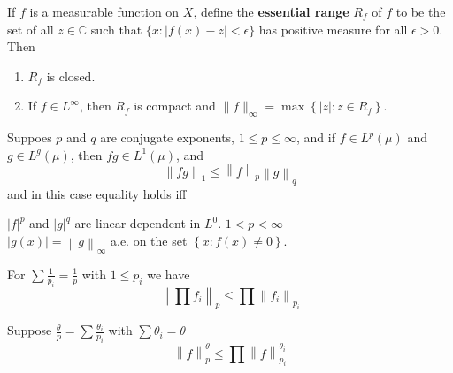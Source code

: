 \documentclass[12pt, a4paper, oneside]{book}
\begin{document}
\begin{proposition}
    If $f$ is a measurable function on $X$, define the \textbf{essential range} $R_f$ of $f$ to be the set of all $z \in \mathbb{C}$ such that $\{x:|f(x)-z|<\epsilon\}$ has positive measure for all $\epsilon>0$. Then
    \begin{enumerate}
        \item
              $R_f$ is closed.
        \item
              If $f \in L^{\infty}$, then $R_f$ is compact and $\|f\|_{\infty}=\max \left\{|z|: z \in R_f\right\}$.
    \end{enumerate}
\end{proposition}


\begin{theorem}
    Suppoes $p$ and $q$ are conjugate exponents, $1 \leq p \leq \infty$, and if $f \in L^{p}(\mu)$ and $g \in L^{g}(\mu)$, then $f g \in L^{1}(\mu)$, and
    \begin{equation*}
        \left\| f g \right\|_1 \leq \left\| f \right\|_p  \left\| g \right\|_q
    \end{equation*}
    and in this case equality holds iff
    \begin{center}
        $\left|f\right|^p$ and $\left|g\right|^q$ are linear dependent in $L^0$.  $1 < p < \infty$ \\
        $\left|g(x)\right|=\left\| g \right\|_{\infty}$ a.e. on the set $\left\{x:f(x) \neq 0\right\}$.
    \end{center}

\end{theorem}

\begin{corollary}[Generalized]
    For $\sum\frac{1}{p_i}=\frac{1}{p}$ with $1 \leq  p_i$ we have
    \begin{equation*}
        \left\| \prod f_i \right\|_p
        \leq
        \prod\left\| f_i \right\|_{p_i}
    \end{equation*}
\end{corollary}




\begin{corollary}[Interpolation]
    Suppose $\frac{\theta}{p}=\sum \frac{\theta_i}{p_i}$ with $\sum \theta_i=\theta$
    \begin{equation*}
        \left\| f   \right\|_{p}^{\theta}
        \leq
        \prod \left\| f \right\|_{p_i}^{\theta_i}
    \end{equation*}
\end{corollary}
\end{document}
